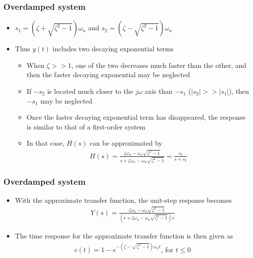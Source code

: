 \begin{frame}
\frametitle{Overdamped system}
\begin{itemize}
\item $s_1 = (\zeta +\sqrt{\zeta^2 -1})\omega_n$ and $s_2 = (\zeta -\sqrt{\zeta^2 -1})\omega_n$
\vspace{0.3cm}
\item Thus $y(t)$ includes two decaying exponential terms
\begin{itemize}
\vspace{0.2cm}
\item When $\zeta >> 1$, one of the two decreases much faster than the other, and then the faster decaying exponential may be neglected
\vspace{0.2cm}
\item If $-s_2$ is located much closer to the $j\omega$ axis than $-s_1$ ($|s_2|>>|s_1|$), then $-s_1$ may be neglected
\vspace{0.3cm}
\item Once the faster decaying exponential term has disappeared, the response is similar to that of a first-order system
\vspace{0.3cm}
\item In that case, $H(s)$ can be approximated by
\\ 
\begin{align*}
H(s) = \frac{\zeta\omega_n - \omega_n\sqrt{\zeta^2-1}}{s+\zeta\omega_n -\omega_n\sqrt{\zeta^2-1}}=\frac{s_2}{s+s_2}
\end{align*}
\end{itemize}
\end{itemize}
\end{frame}

\begin{frame}
\frametitle{Overdamped system}
\begin{itemize}
\item With the approximate transfer function, the unit-step response becomes
\\
\begin{align*}
 Y(s) = \frac{\zeta\omega_n - \omega_n\sqrt{\zeta^2-1}}{(s+\zeta\omega_n -\omega_n\sqrt{\zeta^2-1})s}
\end{align*}
\item The time response for the approximate transfer function is then given as
\\ 
\begin{align*}
c(t)= 1 -e^{-(\zeta-\sqrt{\zeta^2 -1})\omega_n t}\text{, for }t\le 0
\end{align*}
\end{itemize}
\end{frame}

